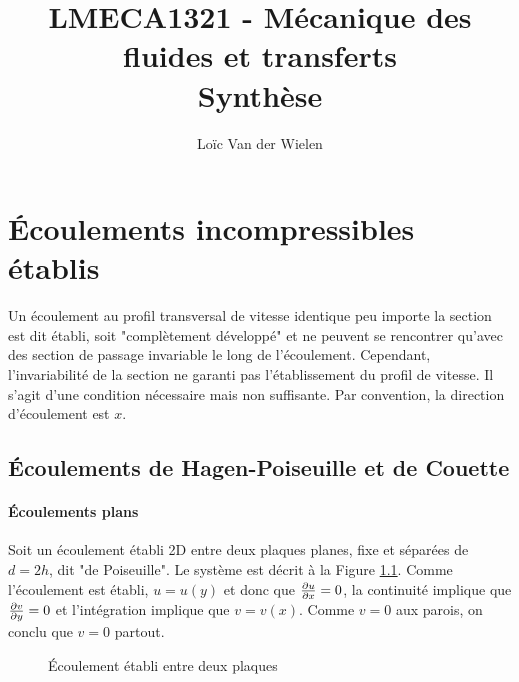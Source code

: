 \documentclass[a4paper,11pt]{report}
\title{LMECA1321 - Mécanique des fluides et transferts\\Synthèse}
\author{Loïc Van der Wielen}
\begin{document}
\maketitle
\tableofcontents





\chapter{Écoulements incompressibles établis}
  Un écoulement au profil transversal de vitesse identique peu importe la section est dit établi, soit "complètement développé" et ne peuvent se rencontrer qu'avec des section de passage invariable le long de l'écoulement. Cependant, l'invariabilité de la section ne garanti pas l'établissement du profil de vitesse. Il s'agit d'une condition nécessaire mais non suffisante. Par convention, la direction d'écoulement est $x$.

  \section{Écoulements de Hagen-Poiseuille et de Couette}
      \subsubsection{Écoulements plans}
        Soit un écoulement établi 2D entre deux plaques planes, fixe et séparées de $d=2h$, dit "de Poiseuille". Le système est décrit à la Figure \ref{fig:Poiseuille}. Comme l'écoulement est établi, $u=u(y)$ et donc que $\pdv{u}{x} = 0$, la continuité implique que $\pdv{v}{y} = 0$ et l'intégration implique que $v = v(x)$. Comme $v=0$ aux parois, on conclu que $v = 0$ partout.
        \begin{figure}[h]
          \centering
          
          \caption{Écoulement établi entre deux plaques}
          \label{fig:Poiseuille}
        \end{figure}
\end{document}

